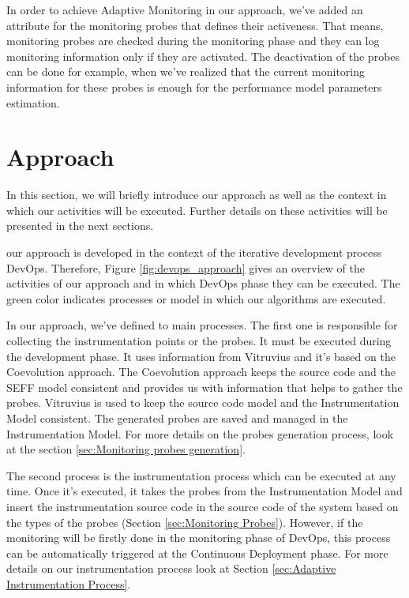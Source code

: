 In order to achieve Adaptive Monitoring in our approach, we've added an attribute for the monitoring probes that defines their activeness. That means, monitoring probes are checked during the monitoring phase and they can log monitoring information only if they are activated. The deactivation of the probes can be done for example, when we've realized that the current monitoring information for these probes is enough for the performance model parameters estimation.



\section{Approach}
\label{sec:approach}
In this section, we will briefly introduce our approach as well as the context in which our activities will be executed. Further details on these activities will be presented in the next sections.

our approach is developed in the context of the iterative development process DevOps. Therefore, Figure \ref{fig:devops_approach} gives an overview of the activities of our approach and in which DevOps phase they can be executed. The green color indicates processes or model in which our algorithms are executed. 

In our approach, we've defined to main processes. The first one is responsible for collecting the instrumentation points or the probes. It must be executed during the development phase. It uses information from Vitruvius and it's based on the Coevolution approach. The Coevolution approach keeps the source code and the SEFF model consistent and provides us with information that helps to gather the probes. Vitruvius is used to keep the source code model and the Instrumentation Model consistent. The generated probes are saved and managed in the Instrumentation Model. For more details on the probes generation process, look at the section \ref{sec:Monitoring probes generation}.

The second process is the instrumentation process which can be executed at any time. Once it's executed, it takes the probes from the Instrumentation Model and insert the instrumentation source code in the source code of the system based on the types of the probes (Section \ref{sec:Monitoring Probes}). However, if the monitoring will be firstly done in the monitoring phase of DevOps, this process can be automatically triggered at the Continuous Deployment phase. For more details on our instrumentation process look at Section \ref{sec:Adaptive Instrumentation Process}.

